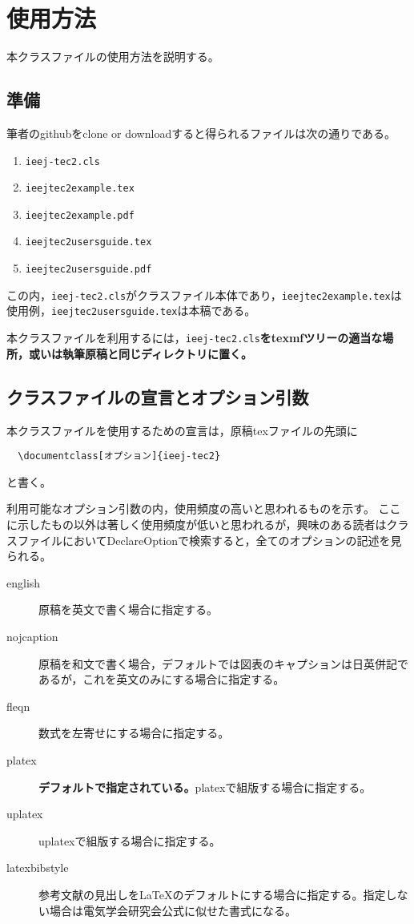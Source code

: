 \documentclass[platex,fleqn]{ieej-tec2}%
\begin{document}
\section{使用方法}
本クラスファイルの使用方法を説明する。

\subsection{準備}
筆者のgithubをclone or downloadすると得られるファイルは次の通りである。
\begin{enumerate}
    \item \texttt{ieej-tec2.cls}
    \item \texttt{ieejtec2example.tex}
    \item \texttt{ieejtec2example.pdf}
    \item \texttt{ieejtec2usersguide.tex}
    \item \texttt{ieejtec2usersguide.pdf}
\end{enumerate}
この内，\texttt{ieej-tec2.cls}がクラスファイル本体であり，\texttt{ieejtec2example.tex}は使用例，\texttt{ieejtec2usersguide.tex}は本稿である。

本クラスファイルを利用するには，\texttt{ieej-tec2.cls}\textbf{をtexmfツリーの適当な場所，或いは執筆原稿と同じディレクトリに置く。}

\subsection{クラスファイルの宣言とオプション引数}
本クラスファイルを使用するための宣言は，原稿texファイルの先頭に
\begin{verbatim}
  \documentclass[オプション]{ieej-tec2}
\end{verbatim}
と書く。

利用可能なオプション引数の内，使用頻度の高いと思われるものを示す。
ここに示したもの以外は著しく使用頻度が低いと思われるが，興味のある読者はクラスファイルにおいてDeclareOptionで検索すると，全てのオプションの記述を見られる。
\begin{description}
\item[english]
原稿を英文で書く場合に指定する。

\item[nojcaption]
原稿を和文で書く場合，デフォルトでは図表のキャプションは日英併記であるが，これを英文のみにする場合に指定する。

\item[fleqn]
数式を左寄せにする場合に指定する。

\item[platex]
\textbf{デフォルトで指定されている。}platexで組版する場合に指定する。

\item[uplatex]
uplatexで組版する場合に指定する。

\item[latexbibstyle]
参考文献の見出しを\LaTeX のデフォルトにする場合に指定する。指定しない場合は電気学会研究会公式に似せた書式になる。
\end{description}
\end{document}

